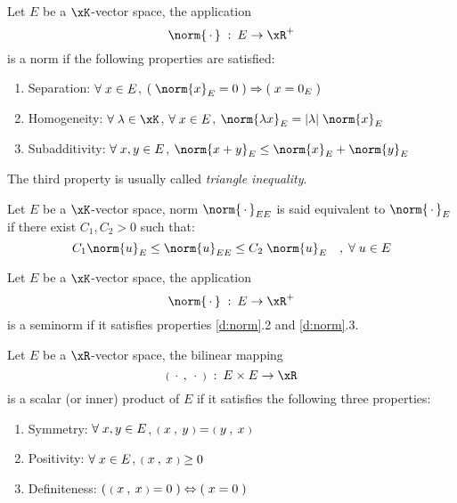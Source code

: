 \medskip
\begin{dfntn}[Norm]\label{d:norm}
Let $E$ be a $\xK$-vector space, the application
\[
\norm{\xDot}\;:\:E\rightarrow \xR^+
\]
 is a norm if the following properties are satisfied:
\begin{enumerate}
\item Separation: ${\forall\;}  x \in E$, $(\;\norm{x}_E = 0\;)\Rightarrow (\;x = 0_E\;)$
\item Homogeneity: $\forany  \lambda \in \xK$, ${\forall\;}  x \in E$, $\norm{\lambda x}_E = |\lambda|\;\norm{x}_E$
\item Subadditivity: ${\forall\;}  x,y \in E$, $\norm{x + y}_E \leq \norm{x}_E + \norm{y}_E$
\end{enumerate}
\end{dfntn}

\begin{nt}
The third property is usually called \textit{triangle inequality}.
\end{nt}

\begin{dfntn}\label{d:equivalent_norms}
Let $E$ be a $\xK$-vector space, norm $\norm{\xDot}_{EE}$ is said equivalent to $\norm{\xDot}_{E}$ if there exist $C_1, C_2 > 0$ such that:
\begin{equation*}
C_1 \norm{u}_{E} \leq \norm{u}_{EE} \leq C_2\;\norm{u}_{E}\quad,\;\forany u \in E
\end{equation*}
\end{dfntn}

\medskip
\begin{dfntn}[Seminorm]\label{d:seminorm}
Let $E$ be a $\xK$-vector space, the application
\[
\norm{\xDot}\;:\:E\rightarrow \xR^+
\]
 is a seminorm if it satisfies properties \eqref{d:norm}.2 and \eqref{d:norm}.3.
\end{dfntn}

\medskip
\begin{dfntn}
Let $E$ be a $\xR$-vector space, the bilinear mapping
\begin{equation*}
\Inner{\xDot}{\xDot}\;:\:E\times E \rightarrow \xR
\end{equation*}
is a scalar (or inner) product of $E$ if it satisfies the following three properties:
\begin{enumerate}
\item Symmetry: ${\forall\;}  x,y \in E$, ${{\scriptstyle\mathbf{(}}\;x\:,\: y \;{\scriptstyle\mathbf{)}}} = {{\scriptstyle\mathbf{(}}\;y\:,\: x \;{\scriptstyle\mathbf{)}}}$
\item Positivity: ${\forall\;}  x \in E$, ${{\scriptstyle\mathbf{(}}\;x\:,\: x \;{\scriptstyle\mathbf{)}}} \geq 0$
\item Definiteness: $(\;{{\scriptstyle\mathbf{(}}\;x\:,\: x \;{\scriptstyle\mathbf{)}}} = 0\;) \Leftrightarrow (\;x = 0\;)$
\end{enumerate}
\end{dfntn}
